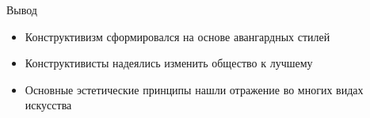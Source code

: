 \begin{frame}{Вывод}
    \begin{itemize}
        \item <1-> Конструктивизм сформировался на основе авангардных стилей
        \item <2-> Конструктивисты надеялись изменить общество к лучшему
        \item <3-> Основные эстетические принципы нашли отражение во многих видах искусства
    \end{itemize}
\end{frame}